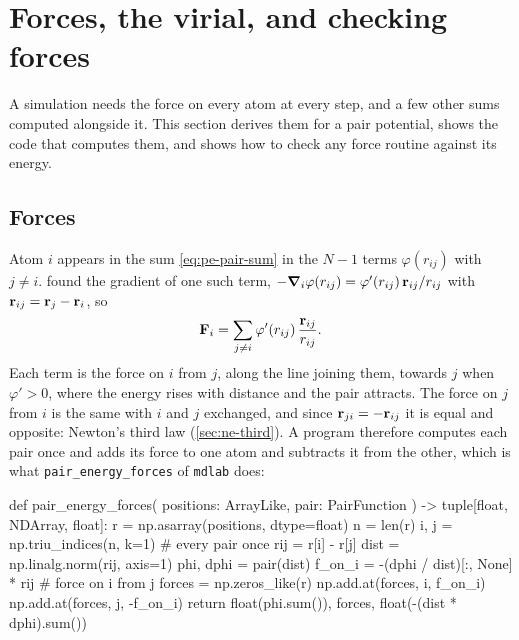 \section{Forces, the virial, and checking forces}
\label{sec:pe-forces}

A simulation needs the force on every atom at every step, and a few other
sums computed alongside it. This section derives them for a pair
potential, shows the code that computes them, and shows how to check any
force routine against its energy.

\subsection*{Forces}

Atom $i$ appears in the sum \cref{eq:pe-pair-sum} in the $N - 1$ terms
$\varphi(r_{ij})$ with $j \ne i$.  found the gradient
of one such term, $-\bm{\nabla}_i\varphi(r_{ij}) = \varphi'(r_{ij})\,\bm{\mathrm{r}}_{ij}/
r_{ij}$ with $\bm{\mathrm{r}}_{ij} = \bm{\mathrm{r}}_j - \bm{\mathrm{r}}_i$, so
\begin{equation}
   \bm{\mathrm{F}}_i = \sum_{j\ne i}\varphi'(r_{ij})\,\frac{\bm{\mathrm{r}}_{ij}}{r_{ij}} .
   \label{eq:pe-pair-force}
\end{equation}
Each term is the force on $i$ from $j$, along the line joining them,
towards $j$ when $\varphi' > 0$, where the energy rises with distance and
the pair attracts. The force on $j$ from $i$ is the same with $i$ and $j$
exchanged, and since $\bm{\mathrm{r}}_{ji} = -\bm{\mathrm{r}}_{ij}$ it is equal and
opposite: Newton's third law (\cref{sec:ne-third}). A program therefore
computes each pair once and adds its force to one atom and subtracts it
from the other, which is what \texttt{pair\_energy\_forces} of
\texttt{mdlab} does:

\begin{code}
def pair_energy_forces(
    positions: ArrayLike, pair: PairFunction
) -> tuple[float, NDArray, float]:
    r = np.asarray(positions, dtype=float)
    n = len(r)
    i, j = np.triu_indices(n, k=1)  # every pair once
    rij = r[i] - r[j]
    dist = np.linalg.norm(rij, axis=1)
    phi, dphi = pair(dist)
    f_on_i = -(dphi / dist)[:, None] * rij  # force on i from j
    forces = np.zeros_like(r)
    np.add.at(forces, i, f_on_i)
    np.add.at(forces, j, -f_on_i)
    return float(phi.sum()), forces, float(-(dist * dphi).sum())
\end{code}

